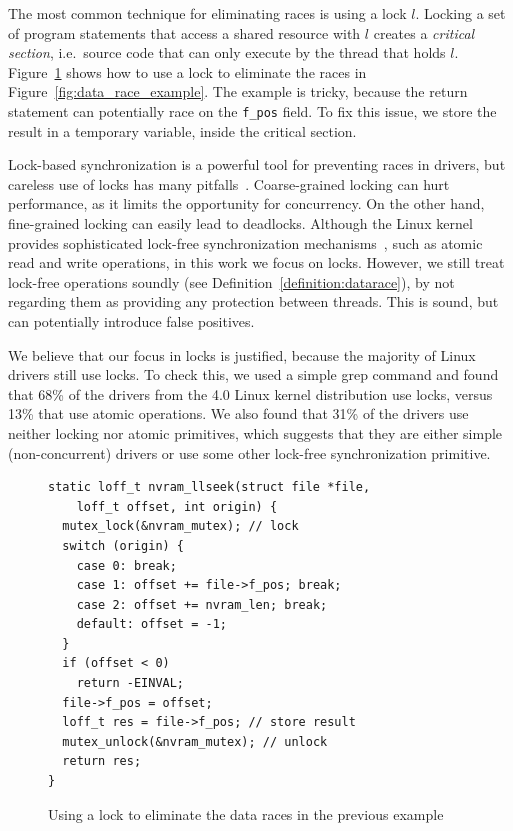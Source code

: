 The most common technique for eliminating races is using a lock $l$. Locking a set of program statements that access a shared resource with $l$ creates a \emph{critical section}, i.e.\ source code that can only execute by the thread that holds $l$. Figure~\ref{fig:lock_example} shows how to use a lock to eliminate the races in Figure~\ref{fig:data_race_example}. The example is tricky, because the return statement can potentially race on the \texttt{f\_pos} field. To fix this issue, we store the result in a temporary variable, inside the critical section.

Lock-based synchronization is a powerful tool for preventing races in drivers, but careless use of locks has many pitfalls~\cite{sutter2005software}. Coarse-grained locking can hurt performance, as it limits the opportunity for concurrency. On the other hand, fine-grained locking can easily lead to deadlocks. Although the Linux kernel provides sophisticated lock-free synchronization mechanisms~\cite{corbet2005linux}, such as atomic read and write operations, in this work we focus on locks. However, we still treat lock-free operations soundly (see Definition~\ref{definition:datarace}), by not regarding them as providing any protection between threads. This is sound, but can potentially introduce false positives.

We believe that our focus in locks is justified, because the majority of Linux drivers still use locks. To check this, we used a simple grep command and found that 68\% of the drivers from the 4.0 Linux kernel distribution use locks, versus 13\% that use atomic operations. We also found that 31\% of the drivers use neither locking nor atomic primitives, which suggests that they are either simple (non-concurrent) drivers or use some other lock-free synchronization primitive.

\begin{figure}[t]
\begin{lstlisting}
static loff_t nvram_llseek(struct file *file,
    loff_t offset, int origin) {
  mutex_lock(&nvram_mutex); // lock
  switch (origin) {
    case 0: break;
    case 1: offset += file->f_pos; break;
    case 2: offset += nvram_len; break;
    default: offset = -1;
  }
  if (offset < 0)
    return -EINVAL;
  file->f_pos = offset;
  loff_t res = file->f_pos; // store result
  mutex_unlock(&nvram_mutex); // unlock
  return res;
}
\end{lstlisting}
\caption{Using a lock to eliminate the data races in the previous example}
\label{fig:lock_example}
\end{figure}

